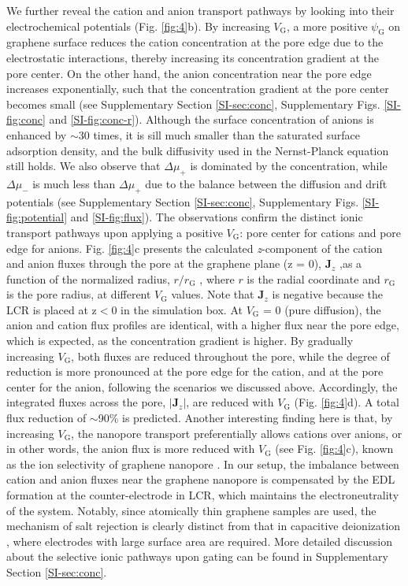 \documentclass[journal=nalefd,email=true, hyperref=true, keywords=false]{achemso}
\newcommand{\Fig}{Fig.}
\begin{document}
We further reveal the cation and anion transport pathways by looking
into their electrochemical potentials (\Fig{} \ref{fig:4}b). By
increasing $V_{\mathrm{G}}$, a more positive $\psi_{\mathrm{G}}$ on
graphene surface reduces the cation concentration at the pore edge due
to the electrostatic interactions, thereby increasing its
concentration gradient at the pore center. On the other hand, the
anion concentration near the pore edge increases exponentially, such
that the concentration gradient at the pore center becomes small (see
{ Supplementary Section \ref{SI-sec:conc}, Supplementary
Figs. \ref{SI-fig:conc} and \ref{SI-fig:conc-r}}).
{
Although the surface
concentration of anions is enhanced by $\sim{}$30 times, it is sill
much smaller than the saturated surface adsorption density, and the
bulk diffusivity used in the Nernst-Planck equation still holds.  We
also observe that $\Delta \mu_{+}$ is dominated by the concentration,
while $\Delta \mu_{-}$ is much less than $\Delta \mu_{+}$ due to the
balance between the diffusion and drift potentials (see Supplementary
Section \ref{SI-sec:conc}, Supplementary Figs.  \ref{SI-fig:potential}
and \ref{SI-fig:flux})}. 
The observations confirm the distinct ionic
transport pathways upon applying a positive $V_{\mathrm{G}}$: pore
center for cations and pore edge for anions. \Fig{} \ref{fig:4}c
presents the calculated \textit{z}-component of the cation and anion
fluxes through the pore at the graphene plane (z = 0),
$\boldsymbol{J}_{z}$ ,as a function of the normalized radius,
$r/r_{\mathrm{G}}$ , where $r$ is the radial coordinate and
$r_{\mathrm{G}}$ is the pore radius, at different $V_{\mathrm{G}}$
values. Note that $\boldsymbol{J}_{z}$ is negative because the LCR is
placed at z$<$0 in the simulation box. At $V_{\mathrm{G}}$ = 0 (pure
diffusion), the anion and cation flux profiles are identical, with a
higher flux near the pore edge, which is expected, as the
concentration gradient is higher. By gradually increasing
$V_{\mathrm{G}}$, both fluxes are reduced throughout the pore, while
the degree of reduction is more pronounced at the pore edge for the
cation, and at the pore center for the anion, following the scenarios
we discussed above. Accordingly, the integrated fluxes across the
pore, $|\boldsymbol{J}_{z}|$, are reduced with $V_{\mathrm{G}}$
(\Fig{} \ref{fig:4}d). A total flux reduction of $\sim$90\% is
predicted. Another interesting finding here is that, by increasing
$V_{\mathrm{G}}$, the nanopore transport preferentially allows cations
over anions, or in other words, the anion flux is more reduced with
$V_{\mathrm{G}}$ (see \Fig{} \ref{fig:4}c), known as the ion
selectivity of graphene nanopore \cite{Rollings_2016}. In our setup,
the imbalance between cation and anion fluxes near the graphene
nanopore is compensated by the EDL formation at the counter-electrode
in LCR, which maintains the electroneutrality of the system. Notably,
since atomically thin graphene samples are used, the mechanism of salt
rejection is clearly distinct from that in capacitive deionization
\cite{Biesheuvel_2010}, where electrodes with large surface area are
required. 
{
More detailed discussion about the selective ionic pathways
upon gating can be found in Supplementary Section \ref{SI-sec:conc}.}
\end{document}
